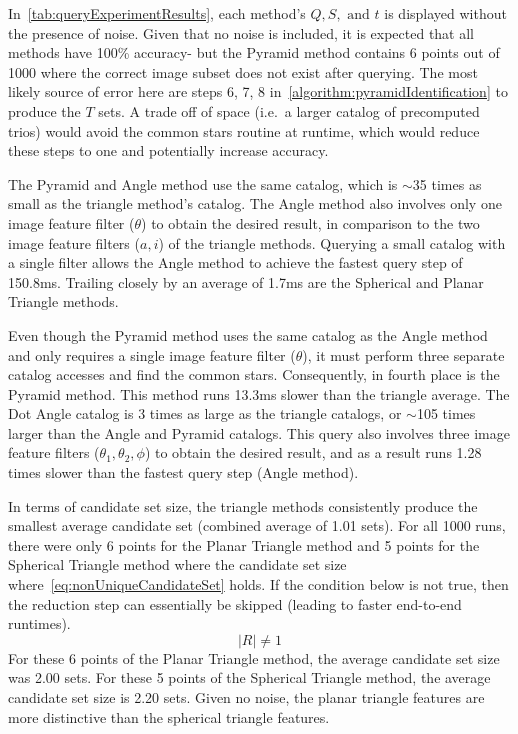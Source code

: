 In~\autoref{tab:queryExperimentResults}, each method's $Q, S, \text{ and } t$ is displayed without the presence of
noise.
Given that no noise is included, it is expected that all methods have 100\% accuracy- but the Pyramid method contains
6 points out of 1000 where the correct image subset does not exist after querying.
The most likely source of error here are steps 6, 7, 8 in~\autoref{algorithm:pyramidIdentification} to produce the
$T$ sets.
A trade off of space (i.e.\ a larger catalog of precomputed trios) would avoid the common stars routine at runtime,
which would reduce these steps to one and potentially increase accuracy.

The Pyramid and Angle method use the same catalog, which is $\sim$35 times as small as the triangle method's catalog.
The Angle method also involves only one image feature filter ($\theta$) to obtain the desired result, in comparison
to the two image feature filters ($a, i$) of the triangle methods.
Querying a small catalog with a single filter allows the Angle method to achieve the fastest query step of 150.8ms.
Trailing closely by an average of 1.7ms are the Spherical and Planar Triangle methods.

Even though the Pyramid method uses the same catalog as the Angle method and only requires a single image feature
filter ($\theta$), it must perform three separate catalog accesses and find the common stars.
Consequently, in fourth place is the Pyramid method.
This method runs 13.3ms slower than the triangle average.
The Dot Angle catalog is 3 times as large as the triangle catalogs, or $\sim$105 times larger than the Angle and Pyramid
catalogs.
This query also involves three image feature filters ($\theta_1, \theta_2, \phi$) to obtain the desired result, and
as a result runs 1.28 times slower than the fastest query step (Angle method).

In terms of candidate set size, the triangle methods consistently produce the smallest average candidate set
(combined average of 1.01 sets).
For all 1000 runs, there were only 6 points for the Planar Triangle method and 5 points for the Spherical Triangle
method where the candidate set size where~\autoref{eq:nonUniqueCandidateSet} holds.
If the condition below is not true, then the reduction step can essentially be skipped (leading to faster end-to-end
runtimes).
\begin{equation}\label{eq:nonUniqueCandidateSet}
    |R| \neq 1
\end{equation}
For these 6 points of the Planar Triangle method, the average candidate set size was 2.00 sets.
For these 5 points of the Spherical Triangle method, the average candidate set size is 2.20 sets.
Given no noise, the planar triangle features are more distinctive than the spherical triangle features.

